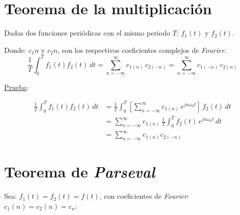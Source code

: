\section{Teorema de la multiplicación}
Dadas dos funciones periódicas con el mismo periodo $T$: $f_1(t)$ y $f_2(t)$.

Donde: $c_1n$ y $c_2n$, son los respectivos coeficientes complejos de
\emph{Fourier}.
\begin{equation}
    \frac{1}{T}\int_0^T f_1(t)f_2(t)\,dt
        =\sum_{n={-\infty}}^\infty c_{1(n)}\,c_{2(-n)}
        =\sum_{n={-\infty}}^\infty c_{1(-n)}\,c_{2(n)}
\end{equation}

\underline{Prueba}:

\begin{equation*}
\begin{split}
    \frac{1}{T}\int_0^T f_1(t)f_2(t)\,dt
        &=\frac{1}{T}\int_0^T\left[
            \sum_{n={-\infty}}^\infty c_{1(n)}\,e^{jn\omega_0 t}
        \right]\,f_2(t)\,dt\\
        &=\sum_{n={-\infty}}^\infty c_{1(n)}\,\frac{1}{T}
            \int_0^T f_2(t)\,e^{jn\omega_0 t}\,dt\\
        &=\sum_{n={-\infty}}^\infty c_{1(n)}c_{2(-n)}
\end{split}
\end{equation*}

\section{Teorema de \emph{Parseval}}
Sea: $f_1(t)=f_2(t)=f(t)$, con coeficientes de \emph{Fourier}:
$c_1(n)=c_2(n)=c_n$:

